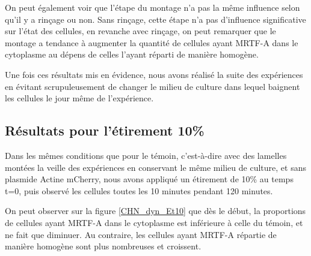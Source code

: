 \documentclass{report}
\begin{document}
On peut également voir que l'étape du montage n'a pas la même influence selon qu'il y a rinçage ou non. Sans rinçage, cette étape n'a pas d'influence significative sur l'état des cellules, en revanche avec rinçage, on peut remarquer que le montage a tendance à augmenter la quantité de cellules ayant MRTF-A dans le cytoplasme au dépens de celles l'ayant réparti de manière homogène. 

Une fois ces résultats mis en évidence, nous avons réalisé la suite des expériences en évitant scrupuleusement de changer le milieu de culture dans lequel baignent les cellules le jour même de l'expérience. 

\subsection{Résultats pour l'étirement 10\%}

Dans les mêmes conditions que pour le témoin, c'est-à-dire avec des lamelles montées la veille des expériences en conservant le même milieu de culture, et sans plasmide Actine mCherry, nous avons appliqué un étirement de 10\% au temps t=0, puis observé les cellules toutes les 10 minutes pendant 120 minutes. 

On peut observer sur la figure \ref{CHN_dyn_Et10} que dès le début, la proportions de cellules ayant MRTF-A dans le cytoplasme est inférieure à celle du témoin, et ne fait que diminuer.
Au contraire, les cellules ayant MRTF-A répartie de manière homogène sont plus nombreuses et croissent. 
\end{document}
